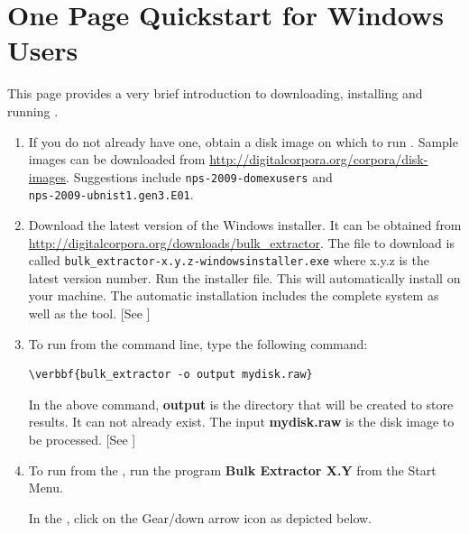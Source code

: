 \documentclass[11pt]{article} %
\begin{document}
\section*{One Page Quickstart for Windows Users}
This page provides a very brief introduction to downloading, installing and running \bulk. 
\begin{enumerate}
\item If you do not already have one, obtain a disk image on which to run \bulk. Sample images can be downloaded from \url{http://digitalcorpora.org/corpora/disk-images}. Suggestions include \texttt{nps-2009-domexusers} and \\ \texttt{nps-2009-ubnist1.gen3.E01}.
\item Download the latest version of the \bulk Windows installer. It can be obtained from \url{http://digitalcorpora.org/downloads/bulk_extractor}. The file to download is called \texttt{bulk\_extractor-x.y.z-windowsinstaller.exe} where x.y.z is the latest version number.  Run the installer file. This will automatically install \bulk on your machine. The automatic installation includes the complete \bulk system as well as the \viewer tool. [See \textbf{} \textbf{}]

\item To run \bulk from the command line, type the following command:
\begin{Verbatim}[commandchars=\\\{\}]
\verbbf{bulk_extractor -o output mydisk.raw}
\end{Verbatim} 

In the above command, \textbf{output} is the directory that will be created to store \bulk results.  It can not already exist. The input \textbf{mydisk.raw} is the disk image to be processed.
[See  \textbf{} \textbf{}]

\item To run \bulk from the \viewer, run the program \textbf{Bulk Extractor X.Y} from the Start Menu. 

In the \viewer, click on the Gear/down arrow icon as depicted below. 
\noindent
\begin{minipage}{\linewidth}
\label{fig:runBulk2}
\end{minipage}


\end{enumerate}
\end{document}
